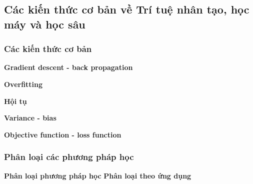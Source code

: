 

\subsection{Các kiến thức cơ bản về  Trí tuệ nhân tạo, học máy và học sâu}
\subsubsection{Các kiến thức cơ bản}
\textbf{Gradient descent - back propagation}

\textbf{Overfitting}

\textbf{Hội tụ}

\textbf{Variance - bias}

\textbf{Objective function - loss function}
\textbf{}
\textbf{}
\textbf{}
\textbf{}
\textbf{}

\subsubsection{Phân loại các phương pháp học}
\textbf{Phân loại phương pháp học}
\textbf{Phân loại theo ứng dụng}

